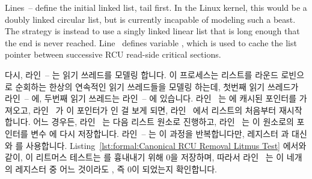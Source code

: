 \begin{lineref}
Lines~-- define the initial linked
list, tail first.
In the Linux kernel, this would be a doubly linked circular list,
but  is currently incapable of modeling such a beast.
The strategy is instead to use a singly linked linear list that
is long enough that the end is never reached.
Line~ defines variable , which is used to
cache the list pointer between successive RCU read-side critical
sections.
\fi

다시, 라인~-- 는 읽기 쓰레드를 모델링 합니다.
이 프로세스는 리스트를 라운드 로빈으로 순회하는 한상의 연속적인 읽기 쓰레드들을
모델링 하는데, 첫번째 읽기 쓰레드가 라인~-- 에, 두번째
읽기 쓰레드는 라인~-- 에 있습니다.
라인~ 는  에 캐시된 포인터를 가져오고,
라인~ 가 이 포인터가  인 걸 보게 되면,
라인~ 에서 리스트의 처음부터 재시작합니다.
어느 경우든, 라인~ 는 다음 리스트 원소로 진행하고,
라인~ 는 이 원소로의 포인터를 변수  에 다시 저장합니다.
라인~-- 는 이 과정을 반복합니다만, 레지스터  과
 대신  와  를 사용합니다.
Listing~\ref{lst:formal:Canonical RCU Removal Litmus Test} 에서와 같이, 이
리트머스 테스트는  를 흉내내기 위해 0을 저장하며, 따라서
라인~ 는 이 네개의 레지스터 중 어느 것이라도 , 즉 0이
되었는지 확인합니다.
\iffalse

Again, \co{P0()} on lines~\lnref{P0start}--\lnref{P0end} models readers.
This process models a pair of successive readers traversing round-robin
through the list, with the first reader on lines~\lnref{rl1}--\lnref{rul1}
and the second reader on lines~\lnref{rl2}--\lnref{rul2}.
Line~\lnref{rdcache} fetches the pointer cached in \co{c}, and if
line~\lnref{rdckcache} sees that the pointer was \co{NULL},
line~\lnref{rdinitcache} restarts at the beginning of the list.
In either case, line~\lnref{rdnext} advances to the next list element,
and line~\lnref{rdupdcache} stores a pointer to this element back into
variable \co{c}.
Lines~\lnref{rl2}--\lnref{rul2} repeat this process, but using
registers \co{r3} and \co{r4} instead of \co{r1} and \co{r2}.
As with
Listing~\ref{lst:formal:Canonical RCU Removal Litmus Test},
this litmus test stores zero to emulate \co{free()}, so
line~\lnref{exists_} checks for any of these four registers being
\co{NULL}, also known as zero.
\fi


\end{lineref}
